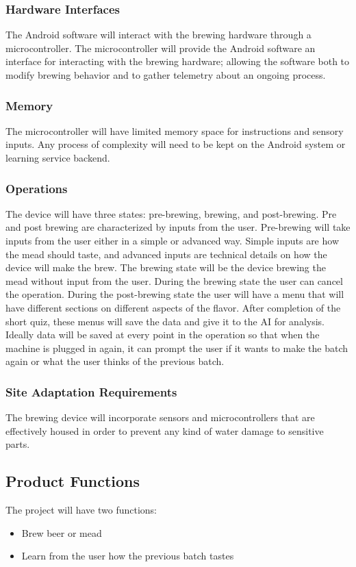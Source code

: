 \documentclass[draftclsnofoot,onecolumn,letterpaper,10pt]{IEEEtran}
\begin{document}
\subsubsection{Hardware Interfaces}
The Android software will interact with the brewing hardware through a microcontroller.
The microcontroller will provide the Android software an interface for interacting with 
the brewing hardware; allowing the software both to modify brewing behavior and to gather
telemetry about an ongoing process.

\subsubsection{Memory}
The microcontroller will have limited memory space for instructions and sensory inputs. Any
process of complexity will need to be kept on the Android system or learning service backend.

\subsubsection{Operations}
The device will have three states: pre-brewing, brewing, and post-brewing.
Pre and post brewing are characterized by inputs from the user.
Pre-brewing will take inputs from the user either in a simple or advanced way.
Simple inputs are how the mead should taste, and advanced inputs are technical details on how the device will make the brew.
The brewing state will be the device brewing the mead without input from the user.
During the brewing state the user can cancel the operation.
During the post-brewing state the user will have a menu that will have different sections on different aspects of the flavor.
After completion of the short quiz, these menus will save the data and give it to the AI for analysis.
Ideally data will be saved at every point in the operation so that when the machine is plugged in again, it can prompt the user if it wants to make the batch again or what the user thinks of the previous batch.

\subsubsection{Site Adaptation Requirements}
The brewing device will incorporate sensors and microcontrollers that are effectively housed
in order to prevent any kind of water damage to sensitive parts.

\subsection{Product Functions}
The project will have two functions:
\begin{itemize}
	\item Brew beer or mead
	\item Learn from the user how the previous batch tastes
\end{itemize}
\end{document}
